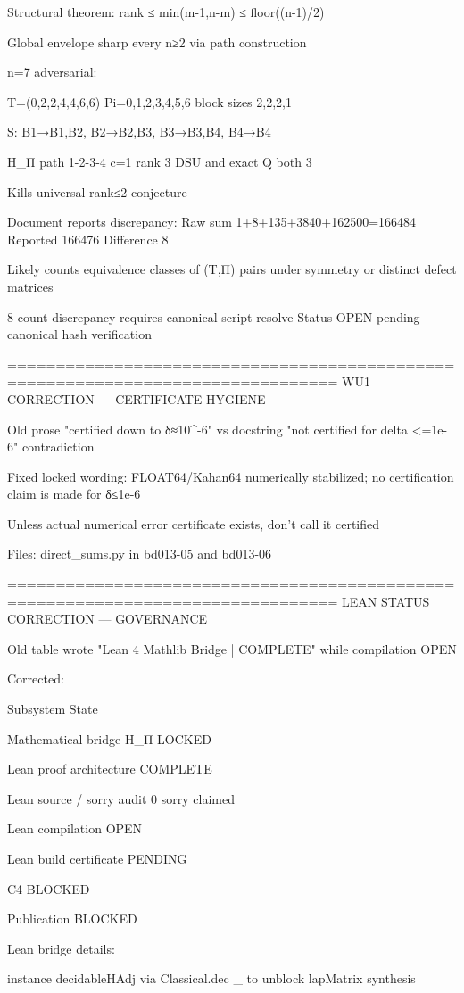 Structural theorem: rank ≤ min(m-1,n-m) ≤ floor((n-1)/2)

Global envelope sharp every n≥2 via path construction


n=7 adversarial:

T=(0,2,2,4,4,6,6) Pi={{0,1},{2,3},{4,5},{6}} block sizes 2,2,2,1

S: B1→{B1,B2}, B2→{B2,B3}, B3→{B3,B4}, B4→{B4}

H_Π path 1-2-3-4 c=1 rank 3 DSU and exact Q both 3

Kills universal rank≤2 conjecture


Document reports discrepancy: Raw sum 1+8+135+3840+162500=166484 Reported 166476 Difference 8

Likely counts equivalence classes of (T,Π) pairs under symmetry or distinct defect matrices

8-count discrepancy requires canonical script resolve Status OPEN pending canonical hash verification


================================================================================ WU1 CORRECTION — CERTIFICATE HYGIENE

Old prose "certified down to δ≈10^{-6}" vs docstring "not certified for delta <=1e-6" contradiction

Fixed locked wording: FLOAT64/Kahan64 numerically stabilized; no certification claim is made for δ≤1e-6

Unless actual numerical error certificate exists, don't call it certified

Files: direct_sums.py in bd013-05 and bd013-06


================================================================================ LEAN STATUS CORRECTION — GOVERNANCE

Old table wrote "Lean 4 Mathlib Bridge | COMPLETE" while compilation OPEN

Corrected:


Subsystem State

Mathematical bridge H_Π LOCKED

Lean proof architecture COMPLETE

Lean source / sorry audit 0 sorry claimed

Lean compilation OPEN

Lean build certificate PENDING

C4 BLOCKED

Publication BLOCKED


Lean bridge details:

instance decidableHAdj via Classical.dec _ to unblock lapMatrix synthesis

